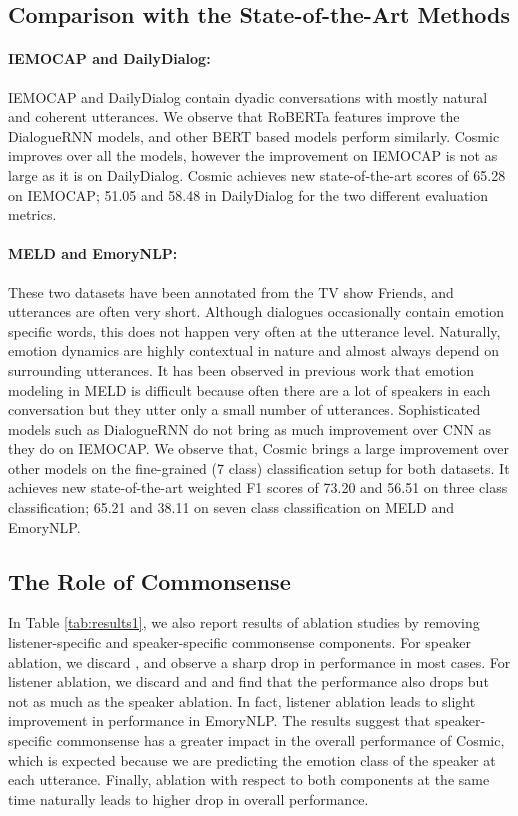 \documentclass[11pt,a4paper]{article}
\begin{document}
\subsection{Comparison with the State-of-the-Art Methods}
\paragraph{IEMOCAP and DailyDialog:} IEMOCAP and DailyDialog contain dyadic conversations with mostly natural and coherent utterances. We observe that RoBERTa features improve the DialogueRNN models, and other BERT based models perform similarly.
{\sc Cosmic} improves over all the models, however the improvement on IEMOCAP is not as large as it is on DailyDialog. {\sc Cosmic} achieves new state-of-the-art scores of 65.28 on IEMOCAP; 51.05 and 58.48 in DailyDialog for the two different evaluation metrics.

\paragraph{MELD and EmoryNLP:} These two datasets have been annotated from the TV show Friends, and  utterances are often very short. Although dialogues occasionally contain emotion specific words, this does not happen very often at the utterance level. Naturally, emotion dynamics are highly contextual in nature and almost always depend on surrounding utterances. It has been observed in previous work that emotion modeling in MELD is difficult because often there are a lot of speakers in each conversation but they utter only a small number of utterances. Sophisticated models such as DialogueRNN do not bring as much improvement over CNN as they do on IEMOCAP.
We observe that, {\sc Cosmic} brings a large improvement over other models on the fine-grained (7 class) classification setup for both  datasets. It achieves new state-of-the-art weighted F1 scores of 73.20 and 56.51 on three class classification; 65.21 and 38.11 on seven class classification on MELD and EmoryNLP.

\subsection{The Role of Commonsense}
In Table \ref{tab:results1}, we also report results of ablation studies by removing listener-specific and speaker-specific commonsense components. For speaker ablation, we discard , and observe a sharp drop in performance in most cases. For listener ablation, we discard  and  and find that the performance also drops but not as much as the speaker ablation. In fact, listener ablation leads to slight improvement in performance in EmoryNLP. The results suggest that speaker-specific commonsense has a greater impact in the overall performance of {\sc Cosmic}, which is expected because we are predicting the emotion class of the speaker at each utterance. Finally, ablation with respect to both components at the same time naturally leads to higher drop in overall performance.
\end{document}
